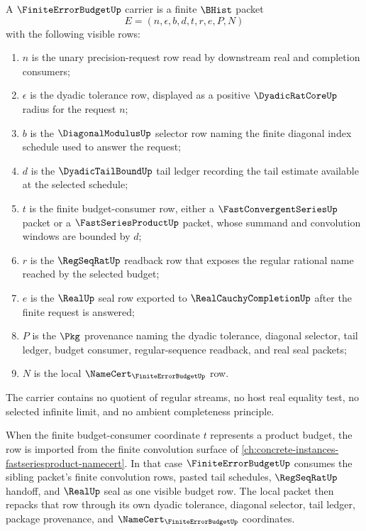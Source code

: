 \begin{definition}
\label{def:finite-error-budget-carrier}
A $\FiniteErrorBudgetUp$ carrier is a finite $\BHist$ packet
$$
E=(n,\epsilon,b,d,t,r,e,P,N)
$$
with the following visible rows:
\begin{enumerate}
\item $n$ is the unary precision-request row read by downstream real and
completion consumers;
\item $\epsilon$ is the dyadic tolerance row, displayed as a positive
$\DyadicRatCoreUp$ radius for the request $n$;
\item $b$ is the $\DiagonalModulusUp$ selector row naming the finite diagonal
index schedule used to answer the request;
\item $d$ is the $\DyadicTailBoundUp$ tail ledger recording the tail estimate
available at the selected schedule;
\item $t$ is the finite budget-consumer row, either a
$\FastConvergentSeriesUp$ packet or a $\FastSeriesProductUp$ packet, whose
summand and convolution windows are bounded by $d$;
\item $r$ is the $\RegSeqRatUp$ readback row that exposes the regular rational
name reached by the selected budget;
\item $e$ is the $\RealUp$ seal row exported to $\RealCauchyCompletionUp$ after
the finite request is answered;
\item $P$ is the $\Pkg$ provenance naming the dyadic tolerance, diagonal
selector, tail ledger, budget consumer, regular-sequence readback, and real
seal packets;
\item $N$ is the local $\NameCert_{\FiniteErrorBudgetUp}$ row.
\end{enumerate}
The carrier contains no quotient of regular streams, no host real equality
test, no selected infinite limit, and no ambient completeness principle.
\end{definition}

When the finite budget-consumer coordinate $t$ represents a product budget,
the row is imported from the finite convolution surface of
\autoref{ch:concrete-instances-fastseriesproduct-namecert}. In that case
$\FiniteErrorBudgetUp$ consumes the sibling packet's finite convolution rows,
pasted tail schedules, $\RegSeqRatUp$ handoff, and $\RealUp$ seal as one
visible budget row. The local packet then repacks that row through its own
dyadic tolerance, diagonal selector, tail ledger, package provenance, and
$\NameCert_{\FiniteErrorBudgetUp}$ coordinates.

